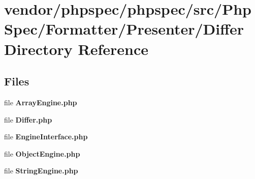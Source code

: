 \section{vendor/phpspec/phpspec/src/\+Php\+Spec/\+Formatter/\+Presenter/\+Differ Directory Reference}
\label{dir_ce2b1544858ae450ec4b9d54e31a5d2b}
\subsection*{Files}
\begin{DoxyCompactItemize}
\item 
file {\bf Array\+Engine.\+php}
\item 
file {\bf Differ.\+php}
\item 
file {\bf Engine\+Interface.\+php}
\item 
file {\bf Object\+Engine.\+php}
\item 
file {\bf String\+Engine.\+php}
\end{DoxyCompactItemize}
